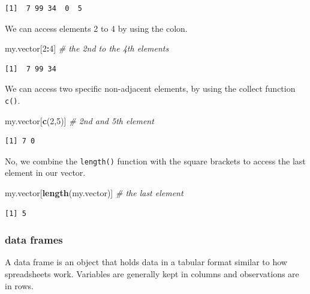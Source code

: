 \documentclass[]{article}
\newenvironment{Shaded}{\begin{snugshade}}{\end{snugshade}}
\newcommand{\KeywordTok}[1]{\textcolor[rgb]{0.13,0.29,0.53}{\textbf{#1}}}
\newcommand{\DecValTok}[1]{\textcolor[rgb]{0.00,0.00,0.81}{#1}}
\newcommand{\CommentTok}[1]{\textcolor[rgb]{0.56,0.35,0.01}{\textit{#1}}}
\newcommand{\OperatorTok}[1]{\textcolor[rgb]{0.81,0.36,0.00}{\textbf{#1}}}
\newcommand{\NormalTok}[1]{#1}
\theoremstyle{definition}
\theoremstyle{definition}
\theoremstyle{definition}
\theoremstyle{remark}
\begin{document}
\begin{verbatim}
[1]  7 99 34  0  5
\end{verbatim}

We can access elements 2 to 4 by using the colon.

\begin{Shaded}
\begin{Highlighting}[]
\NormalTok{my.vector[}\DecValTok{2}\OperatorTok{:}\DecValTok{4}\NormalTok{] }\CommentTok{# the 2nd to the 4th elements}
\end{Highlighting}
\end{Shaded}

\begin{verbatim}
[1]  7 99 34
\end{verbatim}

We can access two specific non-adjacent elements, by using the collect
function \texttt{c()}.

\begin{Shaded}
\begin{Highlighting}[]
\NormalTok{my.vector[}\KeywordTok{c}\NormalTok{(}\DecValTok{2}\NormalTok{,}\DecValTok{5}\NormalTok{)] }\CommentTok{# 2nd and 5th element}
\end{Highlighting}
\end{Shaded}

\begin{verbatim}
[1] 7 0
\end{verbatim}

No, we combine the \texttt{length()} function with the square brackets
to access the last element in our vector.

\begin{Shaded}
\begin{Highlighting}[]
\NormalTok{my.vector[}\KeywordTok{length}\NormalTok{(my.vector)] }\CommentTok{# the last element}
\end{Highlighting}
\end{Shaded}

\begin{verbatim}
[1] 5
\end{verbatim}

\subsubsection{data frames}\label{data-frames}

A data frame is an object that holds data in a tabular format similar to
how spreadsheets work. Variables are generally kept in columns and
observations are in rows.
\end{document}
